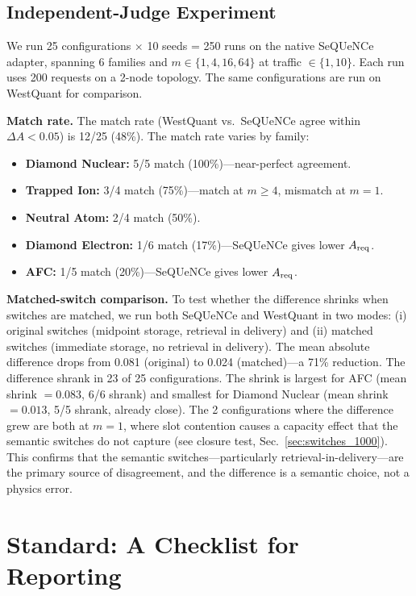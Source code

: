 \documentclass[aps,prapplied,reprint,superscriptaddress]{revtex4-2}
\begin{document}
\subsection{Independent-Judge Experiment}

We run 25 configurations $\times$ 10 seeds = 250 runs on the native SeQUeNCe adapter, spanning 6 families and $m \in \{1, 4, 16, 64\}$ at traffic $\in \{1, 10\}$. Each run uses 200 requests on a 2-node topology. The same configurations are run on WestQuant for comparison.

\textbf{Match rate.} The match rate (WestQuant vs.\ SeQUeNCe agree within $\Delta A < 0.05$) is 12/25 (48\%). The match rate varies by family:

\begin{itemize}[leftmargin=2em]
\item \textbf{Diamond Nuclear:} 5/5 match (100\%)---near-perfect agreement.
\item \textbf{Trapped Ion:} 3/4 match (75\%)---match at $m \geq 4$, mismatch at $m=1$.
\item \textbf{Neutral Atom:} 2/4 match (50\%).
\item \textbf{Diamond Electron:} 1/6 match (17\%)---SeQUeNCe gives lower $A_{\rm req}$.
\item \textbf{AFC:} 1/5 match (20\%)---SeQUeNCe gives lower $A_{\rm req}$.
\end{itemize}

\textbf{Matched-switch comparison.} To test whether the difference shrinks when switches are matched, we run both SeQUeNCe and WestQuant in two modes: (i) original switches (midpoint storage, retrieval in delivery) and (ii) matched switches (immediate storage, no retrieval in delivery). The mean absolute difference drops from 0.081 (original) to 0.024 (matched)---a 71\% reduction. The difference shrank in 23 of 25 configurations. The shrink is largest for AFC (mean shrink $= 0.083$, 6/6 shrank) and smallest for Diamond Nuclear (mean shrink $= 0.013$, 5/5 shrank, already close). The 2 configurations where the difference grew are both at $m=1$, where slot contention causes a capacity effect that the semantic switches do not capture (see closure test, Sec.~\ref{sec:switches_1000}). This confirms that the semantic switches---particularly retrieval-in-delivery---are the primary source of disagreement, and the difference is a semantic choice, not a physics error.

\section{Standard: A Checklist for Reporting}
\label{sec:standard}
\end{document}
